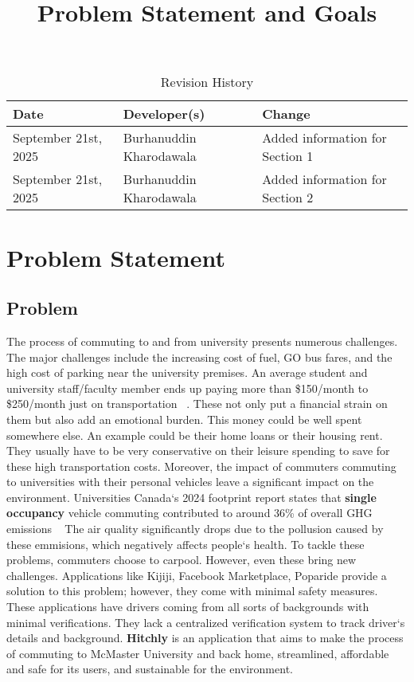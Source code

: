 \documentclass{article}
\title{Problem Statement and Goals\\\progname}
\author{\authname}
\date{}
\begin{document}
\maketitle

\begin{table}[hp]
\caption{Revision History} \label{TblRevisionHistory}
\begin{tabularx}{\textwidth}{llX}
\toprule
\textbf{Date} & \textbf{Developer(s)} & \textbf{Change}\\
\midrule
September 21st, 2025 & Burhanuddin Kharodawala & Added information for Section 1\\
September 21st, 2025 & Burhanuddin Kharodawala & Added information for Section 2\\
\bottomrule
\end{tabularx}
\end{table}

\section{Problem Statement}

\subsection{Problem}

The process of commuting to and from university presents numerous 
challenges. The major challenges include the 
increasing cost of fuel, GO bus fares, and the high 
cost of parking near the university premises. 
An average student and university staff/faculty 
member ends up paying more than 
\$150/month to \$250/month just on transportation ~\citep{ChandaAndSo2025}.
These not only put a financial strain on them but also 
add an emotional burden. This money could be well spent somewhere else. 
An example could be their home loans or their housing rent. 
They usually have to be very conservative on their leisure spending to save for these high transportation costs.
Moreover, the impact 
of commuters commuting to universities with their 
personal vehicles leave a significant impact on 
the environment. Universities Canada`s 2024 
footprint report states that \textbf{single occupancy} vehicle commuting contributed to around 
36\% of overall GHG emissions ~\citep{Kebirungi2024}
The air quality significantly drops due to the pollusion caused by these emmisions, which negatively affects people`s health.
To tackle these problems, commuters choose 
to carpool. However, even these bring new 
challenges. Applications like Kijiji, 
Facebook Marketplace, Poparide provide a 
solution to this problem; however, they come 
with minimal safety measures. These applications 
have drivers coming from all sorts of backgrounds 
with minimal verifications. They lack a centralized 
verification system to track driver`s details and background. 
\textbf{Hitchly} is an application that aims to make the process of commuting to McMaster 
University and back home, streamlined, affordable and safe for its users, and 
sustainable for the environment. 
\end{document}

